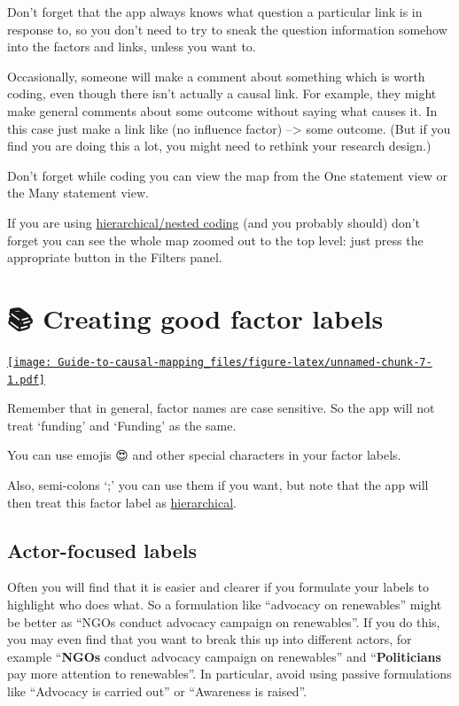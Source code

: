 \documentclass[
]{book}
\begin{document}
Don't forget that the app always knows what question a particular link is in response to, so you don't need to try to sneak the question information somehow into the factors and links, unless you want to.

Occasionally, someone will make a comment about something which is worth coding, even though there isn't actually a causal link. For example, they might make general comments about some outcome without saying what causes it. In this case just make a link like (no influence factor) --\textgreater{} some outcome. (But if you find you are doing this a lot, you might need to rethink your research design.)

Don't forget while coding you can view the map from the One statement view or the Many statement view.

If you are using \protect\hyperlink{xhierarchical-coding}{hierarchical/nested coding} (and you probably should) don't forget you can see the whole map zoomed out to the top level: just press the appropriate button in the Filters panel.

\hypertarget{creating-good-factor-labels}{%
\chapter{📚 Creating good factor labels}\label{creating-good-factor-labels}}

\href{https://player.vimeo.com/video/580212681}{\texttt{[image: Guide-to-causal-mapping\_files/figure-latex/unnamed-chunk-7-1.pdf]}}

Remember that in general, factor names are case sensitive. So the app will not treat `funding' and `Funding' as the same.

You can use emojis 😍 and other special characters in your factor labels.

Also, semi-colons `;' you can use them if you want, but note that the app will then treat this factor label as \protect\hyperlink{xhierarchical-coding}{hierarchical}.

\hypertarget{actor-focused-labels}{%
\section{Actor-focused labels}\label{actor-focused-labels}}

Often you will find that it is easier and clearer if you formulate your labels to highlight who does what. So a formulation like ``advocacy on renewables'' might be better as ``NGOs conduct advocacy campaign on renewables''. If you do this, you may even find that you want to break this up into different actors, for example ``\textbf{NGOs} conduct advocacy campaign on renewables'' and ``\textbf{Politicians} pay more attention to renewables''. In particular, avoid using passive formulations like ``Advocacy is carried out'' or ``Awareness is raised''.
\end{document}
